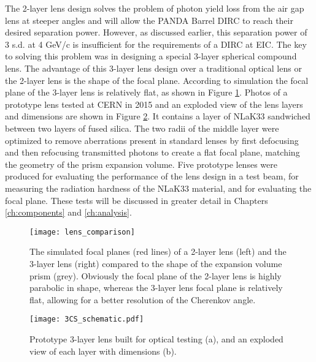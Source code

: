 The 2-layer lens design solves the problem of photon yield loss from the air gap lens at steeper angles and will allow the PANDA Barrel DIRC to reach their desired separation power. However, as discussed earlier, this separation power of 3 s.d. at 4 GeV/c is insufficient for the requirements of a DIRC at EIC. The key to solving this problem was in designing a special 3-layer spherical compound lens. The advantage of this 3-layer lens design over a traditional optical lens or the 2-layer lens is the shape of the focal plane. According to simulation the focal plane of the 3-layer lens is relatively flat, as shown in Figure \ref{fig:lens_focal_plane}. Photos of a prototype lens tested at CERN in 2015 and an exploded view of the lens layers and dimensions are shown in Figure \ref{fig:3CS_schematic}. It contains a layer of NLaK33 sandwiched between two layers of fused silica. The two radii of the middle layer were optimized to remove aberrations present in standard lenses by first defocusing and then refocusing transmitted photons to create a flat focal plane, matching the geometry of the prism expansion volume. Five prototype lenses were produced for evaluating the performance of the lens design in a test beam, for measuring the radiation hardness of the NLaK33 material, and for evaluating the focal plane. These tests will be discussed in greater detail in Chapters \ref{ch:components} and \ref{ch:analysis}.

\begin{figure}[!htb]
	\centering
	\texttt{[image: lens\_comparison]}
	\caption{The simulated focal planes (red lines) of a 2-layer lens (left) and the 3-layer lens (right) compared to the shape of the expansion volume prism (grey). Obviously the focal plane of the 2-layer lens is highly parabolic in shape, whereas the 3-layer lens focal plane is relatively flat, allowing for a better resolution of the Cherenkov angle.}
	\label{fig:lens_focal_plane}
\end{figure}

\begin{figure}[!htb]
	\centering
	\texttt{[image: 3CS\_schematic.pdf]}
	\caption{Prototype 3-layer lens built for optical testing (a), and an exploded view of each layer with dimensions (b).}
	\label{fig:3CS_schematic}
\end{figure}


